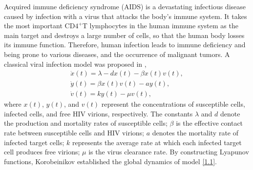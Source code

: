 \documentclass[reqno]{amsart}
\begin{document}
Acquired immune deficiency syndrome (AIDS)
is a devastating infectious disease caused by infection with a virus that attacks 
the body's immune system. It takes the most important CD$4^{+}$T lymphocytes in 
the human immune system as the main target and destroys a large number  
of cells, so that the human body losses its immune function. 
Therefore, human infection leads to immune deficiency and being prone to
various diseases, and the occurrence of malignant tumors.
A classical viral infection model was proposed in \cite{BM},
\begin{equation}\label{1.1}
\begin{gathered}
\dot{x}(t)=\lambda-dx(t)-\beta x(t)v(t),  \\
\dot{y}(t)=\beta x(t)v(t)-ay(t),\\
\dot{v}(t)=ky(t)-\mu v(t),
\end{gathered}
\end{equation}
where $x(t)$, $y(t)$, and $v(t)$ represent the concentrations of susceptible cells, 
infected cells, and free HIV virions, respectively.
The constants $\lambda$ and $d$  denote the production  and mortality rates of 
susceptible cells; $\beta$ is the effective
contact rate between susceptible cells and HIV virions; 
$a$ denotes the mortality rate of infected target cells; 
$k$ represents the average rate at which each infected target
cell produces free virions; $\mu$ is the virus clearance rate.  
By constructing Lyapunov functions, Korobeinikov \cite{K}  established  the global 
dynamics of  model \eqref{1.1}.
\end{document}
